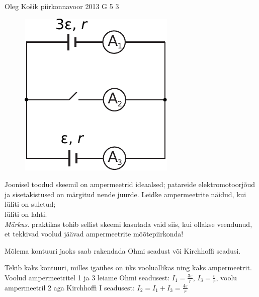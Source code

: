 {Oleg Košik} %
{piirkonnavoor} %
{2013} %
{G 5} %
{3} %
{
\ifStatement
\begin{figure}%
\vspace{-10pt}
\includegraphics[width=\linewidth]{2013-v2g-05-skeem}%
\end{figure}
Joonisel toodud skeemil on ampermeetrid ideaalsed; patareide elektromotoorjõud
ja sisetakistused on märgitud nende juurde. Leidke ampermeetrite näidud, kui\\
\osa lüliti on suletud;\\
\osa lüliti on lahti.\\
\emph{Märkus}. praktikas tohib
sellist skeemi kasutada vaid siis, kui ollakse veendunud, et tekkivad voolud
jäävad ampermeetrite mõõtepiirkonda!
\fi


\ifHint
Mõlema kontuuri jaoks saab rakendada Ohmi seadust või Kirchhoffi seadusi.
\fi


\ifSolution
\osa Tekib kaks kontuuri, milles igaühes on üks vooluallikas ning kaks ampermeetrit. Voolud ampermeetritel 1 ja 3 leiame Ohmi seadusest: $I_1=\frac{3\varepsilon}{r}$, $I_3=\frac{\varepsilon}{r}$, voolu ampermeetril 2 aga Kirchhoffi I seadusest: $I_2=I_1+I_3=\frac{4\varepsilon}{r}$

}
